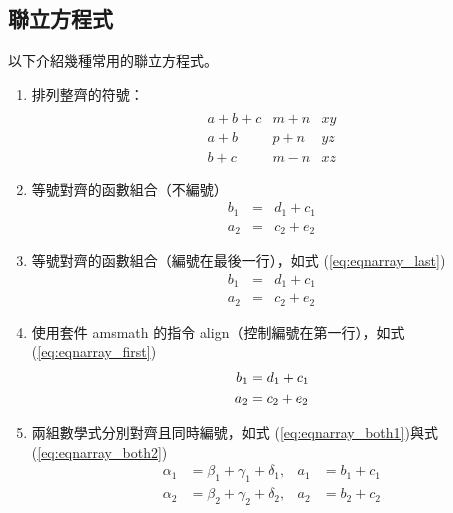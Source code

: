\subsection{聯立方程式}

以下介紹幾種常用的聯立方程式。

\begin{enumerate}

    \item 排列整齊的符號：
        $$ \begin{array}{clr}\\
            a+b+c   & m+n 	& xy \\
            a+b     & p+n 	& yz \\
            b+c     & m-n 	& xz
        \end{array} $$

    \item 等號對齊的函數組合（不編號）
        \begin{eqnarray*}
          b_1 &=& d_1+c_1 \\
          a_2 &=& c_2+e_2
        \end{eqnarray*}

    \item 等號對齊的函數組合（編號在最後一行），如式 (\ref{eq:eqnarray_last})
        \begin{eqnarray}\label{eq:eqnarray_last}
\nonumber b_1 &=& d_1+c_1 \\
          a_2 &=& c_2+e_2
        \end{eqnarray}

    \item 使用套件 {\A amsmath} 的指令 {\A align}（控制編號在第一行），如式 (\ref{eq:eqnarray_first})
        \begin{align} 
            b_1 &= d_1+c_1 \label{eq:eqnarray_first}\\
            a_2 &= c_2+e_2 \notag
        \end{align}

    \item 兩組數學式分別對齊且同時編號，如式 (\ref{eq:eqnarray_both1})與式(\ref{eq:eqnarray_both2})
    \begin{align}
        \alpha_1 &= \beta_1+\gamma_1+\delta_1, &a_1 &= b_1+c_1 \label{eq:eqnarray_both1}\\
        \alpha_2 &= \beta_2+\gamma_2+\delta_2, &a_2 &= b_2+c_2 \label{eq:eqnarray_both2}
    \end{align}


\end{enumerate}
